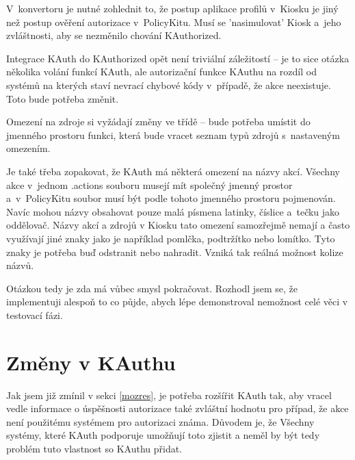 V~konvertoru je nutné zohlednit to, že postup aplikace profilů v~Kiosku je jiný než postup ověření autorizace v~PolicyKitu. Musí se 'nasimulovat' Kiosk a~jeho zvláštnosti, aby se nezměnilo chování KAuthorized.

Integrace KAuth do KAuthorized opět není triviální záležitostí -- je to sice otázka několika volání funkcí KAuth, ale autorizační funkce KAuthu na rozdíl od systémů na kterých staví nevrací chybové kódy v~případě, že akce neexistuje. Toto bude potřeba změnit.

Omezení na zdroje  si vyžádají změny ve třídě  -- bude potřeba umístit do jmenného prostoru  funkci, která bude vracet seznam typů zdrojů s~nastaveným omezením.

Je také třeba zopakovat, že KAuth má některá omezení na názvy akcí. Všechny akce v~jednom .actions souboru musejí mít společný jmenný prostor a~v~PolicyKitu soubor musí být podle tohoto jmenného prostoru pojmenován. Navíc mohou názvy obsahovat pouze malá písmena latinky, číslice a~tečku jako oddělovač. Názvy akcí a zdrojů v Kiosku tato omezení samozřejmě nemají a často využívají jiné znaky jako je například pomlčka, podtržítko nebo lomítko. Tyto znaky je potřeba buď odstranit nebo nahradit. Vzniká tak reálná možnost kolize názvů.

Otázkou tedy je zda má vůbec smysl pokračovat. Rozhodl jsem se, že implementuji alespoň to co půjde, abych lépe demonstroval nemožnost celé věci v testovací fázi.
\section{Změny v KAuthu}
Jak jsem již zmínil v sekci \ref{mozres}, je potřeba rozšířit KAuth tak, aby vracel vedle informace o úspěšnosti autorizace také zvláštní hodnotu pro případ, že akce není použitému systémem pro autorizaci známa. Důvodem je, že  Všechny systémy, které KAuth podporuje umožňují toto zjistit a neměl by být tedy problém tuto vlastnost so KAuthu přidat.
